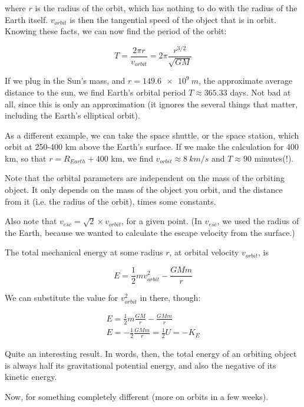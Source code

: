 where $r$ is the radius of the orbit, which has nothing to do with the radius of the Earth itself. $v_{orbit}$ is then the tangential speed of the object that is in orbit. Knowing these facts, we can now find the period of the orbit:

\begin{equation}
T = \frac{2 \pi r}{v_{orbit}} = 2 \pi \frac{r^{3/2}}{\sqrt{G M}}
\end{equation}

If we plug in the Sun's mass, and $r = \SI{149.6e9}{m}$, the approximate average distance to the sun, we find Earth's orbital period $T \approx 365.33$ days. Not bad at all, since this is only an approximation (it ignores the several things that matter, including the Earth's elliptical orbit).

As a different example, we can take the space shuttle, or the space station, which orbit at 250-400 km above the Earth's surface. If we make the calculation for 400 km, so that $r = R_{Earth} + 400$ km, we find $v_{orbit} \approx \SI{8}{km/s}$ and $T \approx 90$ minutes(!).

Note that the orbital parameters are independent on the mass of the orbiting object. It only depends on the mass of the object you orbit, and the distance from it (i.e. the radius of the orbit), times some constants.

Also note that $v_{esc} = \sqrt{2} \times v_{orbit}$, for a given point. (In $v_{esc}$, we used the radius of the Earth, because we wanted to calculate the escape velocity from the surface.)

The total mechanical energy at some radius $r$, at orbital velocity $v_{orbit}$, is

\begin{equation}
E = \frac{1}{2} m v_{orbit}^2 - \frac{G M m}{r}
\end{equation}

We can substitute the value for $v_{orbit}^2$ in there, though:

\begin{align}
E = \frac{1}{2} m \frac{G M}{r} - \frac{G M m}{r}\\
E = -\frac{1}{2} \frac{G M m}{r} = \frac{1}{2} U = - K_E
\end{align}

Quite an interesting result. In words, then, the total energy of an orbiting object is always half its gravitational potential energy, and also the negative of its kinetic energy.

Now, for something completely different (more on orbits in a few weeks).

